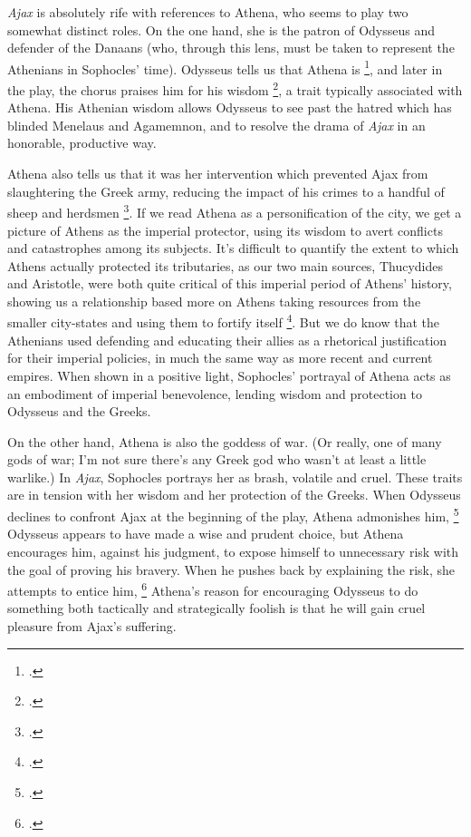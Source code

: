 

\textit{Ajax} is absolutely rife with references to Athena, who seems to play two somewhat
distinct roles. On the one hand, she is the patron of Odysseus and defender of the Danaans
(who, through this lens, must be taken to represent the Athenians in Sophocles'
time). Odysseus tells us that Athena is  \footcite[l. 14]{ajax}, and later in the play, the chorus praises him for his
wisdom \footcite[ll. 1374--1375]{ajax}, a trait typically associated with Athena. His
Athenian wisdom allows Odysseus to see past the hatred which has blinded Menelaus and
Agamemnon, and to resolve the drama of \textit{Ajax} in an honorable, productive
way.

Athena also tells us that it was her intervention which prevented Ajax from slaughtering
the Greek army, reducing the impact of his crimes to a handful of sheep and herdsmen
\footcite[ll. 40--75]{ajax}. If we read Athena as a personification of the city, we get a
picture of Athens as the imperial protector, using its wisdom to avert conflicts and
catastrophes among its subjects. It's difficult to quantify the extent to which Athens
actually protected its tributaries, as our two main sources, Thucydides and Aristotle,
were both quite critical of this imperial period of Athens' history, showing us a
relationship based more on Athens taking resources from the smaller city-states and using
them to fortify itself \footcite[ch. 23--25]{aristotle_constitution}. But we do know that
the Athenians used defending and educating their allies as a rhetorical justification for
their imperial policies, in much the same way as more recent and current empires. When
shown in a positive light, Sophocles' portrayal of Athena acts as an embodiment of
imperial benevolence, lending wisdom and protection to Odysseus and the Greeks.


On the other hand, Athena is also the goddess of war. (Or really, one of many gods of war;
I'm not sure there's any Greek god who wasn't at least a little warlike.) In
\textit{Ajax}, Sophocles portrays her as brash, volatile and cruel. These traits are in
tension with her wisdom and her protection of the Greeks. When Odysseus declines to
confront Ajax at the beginning of the play, Athena admonishes him,  \footcite[l. 75]{ajax} Odysseus appears to
have made a wise and prudent choice, but Athena encourages him, against his judgment, to
expose himself to unnecessary risk with the goal of proving his bravery. When he pushes
back by explaining the risk, she attempts to entice him,  \footcite[l. 79]{ajax} Athena's reason for encouraging
Odysseus to do something both tactically and strategically foolish is that he will gain
cruel pleasure from Ajax's suffering.


